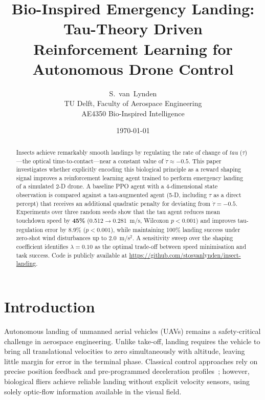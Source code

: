 \documentclass[10pt,twocolumn]{article}
\begin{document}
\title{Bio-Inspired Emergency Landing: Tau-Theory Driven\\
       Reinforcement Learning for Autonomous Drone Control}
\author{S.~van~Lynden\\[2pt]
        TU Delft, Faculty of Aerospace Engineering\\
        AE4350 Bio-Inspired Intelligence}
\date{\today}

\maketitle
\thispagestyle{fancy}

\begin{abstract}
Insects achieve remarkably smooth landings by regulating the rate of change of
\emph{tau} ($\tau$)---the optical time-to-contact---near a constant value of
$\dot{\tau} \approx -0.5$.
This paper investigates whether explicitly encoding this biological principle as
a reward shaping signal improves a reinforcement learning agent trained to perform
emergency landing of a simulated 2-D drone.
A baseline PPO agent with a 4-dimensional state observation is compared against a
tau-augmented agent (5-D, including $\tau$ as a direct percept) that receives an
additional quadratic penalty for deviating from $\dot{\tau} = -0.5$.
Experiments over three random seeds show that the tau agent reduces mean touchdown
speed by \textbf{45\%} (0.512$\rightarrow$0.281~m/s, Wilcoxon $p{<}0.001$) and
improves tau-regulation error by 8.9\% ($p{<}0.001$), while maintaining 100\%
landing success under zero-shot wind disturbances up to 2.0~m/s$^2$.
A sensitivity sweep over the shaping coefficient identifies $\lambda = 0.10$ as
the optimal trade-off between speed minimisation and task success.
Code is publicly available at
\url{https://github.com/stosvanlynden/insect-landing}.
\end{abstract}

\section{Introduction}
\label{sec:intro}

Autonomous landing of unmanned aerial vehicles (UAVs) remains a safety-critical
challenge in aerospace engineering.
Unlike take-off, landing requires the vehicle to bring all translational velocities
to zero simultaneously with altitude, leaving little margin for error in the
terminal phase.
Classical control approaches rely on precise position feedback and pre-programmed
deceleration profiles~\cite{flores2012}; however, biological fliers achieve reliable
landing without explicit velocity sensors, using solely optic-flow information
available in the visual field.
\end{document}
